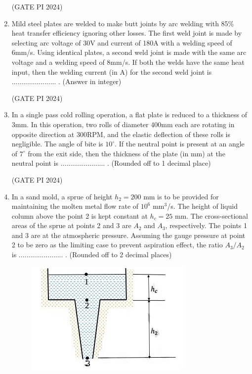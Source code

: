 \documentclass[journal,12pt,onecolumn]{IEEEtran}
\theoremstyle{remark}
\begin{document}
\begin{enumerate}
\hfill (GATE PI 2024)

\item Mild steel plates are welded to make butt joints by arc welding with 85\% heat transfer efficiency ignoring other losses. The first weld joint is made by selecting arc voltage of 30V and current of 180A with a welding speed of 6mm/s. Using identical plates, a second weld joint is made with the same arc voltage and a welding speed of 8mm/s. If both the welds have the same heat input, then the welding current (in A) for the second weld joint is ....................... . (Answer in integer)

\hfill (GATE PI 2024)

\item In a single pass cold rolling operation, a flat plate is reduced to a thickness of 3mm. In this operation, two rolls of diameter 400mm each are rotating in opposite direction at 300RPM, and the elastic deflection of these rolls is negligible. The angle of bite is $10^\circ$. If the neutral point is present at an angle of $7^\circ$ from the exit side, then the thickness of the plate (in mm) at the neutral point is ....................... . (Rounded off to 1 decimal place)

\hfill (GATE PI 2024)

\item In a sand mold, a sprue of height $h_2 = 200$ mm is to be provided for maintaining the molten metal flow rate of $10^6$ mm$^3$/s. The height of liquid column above the point 2 is kept constant at $h_c = 25$ mm. The cross-sectional areas of the sprue at points 2 and 3 are $A_2$ and $A_3$, respectively. The points 1 and 3 are at the atmospheric pressure. Assuming the gauge pressure at point 2 to be zero as the limiting case to prevent aspiration effect, the ratio $A_3/A_2$ is ....................... . (Rounded off to 2 decimal places)

\begin{figure}[H]
\centering
\includegraphics[width=0.5\columnwidth]{fig11.png}
\caption{}
\end{figure}


\end{enumerate}
\end{document}
